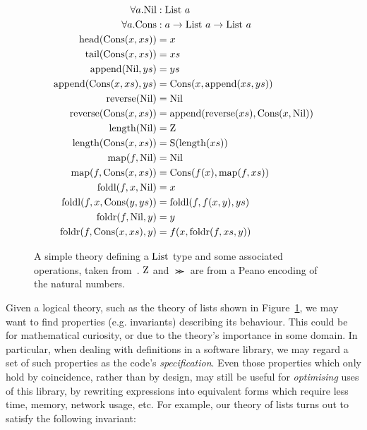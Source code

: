 \begin{figure}
  \begin{equation*}
    \begin{split}
      \forall a. \text{Nil}            &: \text{List} \ a                                  \\
      \forall a. \text{Cons}           &: a \rightarrow \text{List} \ a \rightarrow \text{List} \ a \\
      \text{head}(\text{Cons}(x, xs))        &= x                                       \\
      \text{tail}(\text{Cons}(x, xs))        &= xs                                      \\
      \text{append}(\text{Nil},         ys)  &= ys                                      \\
      \text{append}(\text{Cons}(x, xs), ys)  &= \text{Cons}(x, \text{append}(xs, ys))               \\
      \text{reverse}(\text{Nil})             &= \text{Nil}                                    \\
      \text{reverse}(\text{Cons}(x, xs))     &= \text{append}(\text{reverse}(xs), \text{Cons}(x, \text{Nil}))   \\
      \text{length}(\text{Nil})              &= \text{Z}                                   \\
      \text{length}(\text{Cons}(x, xs))      &= \text{S} (\text{length}(xs))                     \\
      \text{map}(f, \text{Nil})              &= \text{Nil}                                    \\
      \text{map}(f, \text{Cons}(x, xs))      &= \text{Cons}(f(x), \text{map}(f, xs))                \\
      \text{foldl}(f, x, \text{Nil})         &= x                                       \\
      \text{foldl}(f, x, \text{Cons}(y, ys)) &= \text{foldl}(f, f(x, y), ys)                  \\
      \text{foldr}(f, \text{Nil},         y) &= y                                       \\
      \text{foldr}(f, \text{Cons}(x, xs), y) &= f(x, \text{foldr}(f, xs, y))
    \end{split}
  \end{equation*}
  \caption{A simple theory defining a $\text{List}$ type and some associated
    operations, taken from~\cite{Johansson.Dixon.Bundy:conjecture-generation}.
    $\text{Z}$ and $\Succ$ are from a Peano encoding of the natural numbers.}
  \label{figure:list_theory}
\end{figure}

Given a logical theory, such as the theory of lists shown in
Figure~\ref{figure:list_theory}, we may want to find properties (e.g.
invariants) describing its behaviour. This could be for mathematical curiosity,
or due to the theory's importance in some domain. In particular, when dealing
with definitions in a software library, we may regard a set of such properties
as the code's \emph{specification}. Even those properties which only hold by
coincidence, rather than by design, may still be useful for \emph{optimising}
uses of this library, by rewriting expressions into equivalent forms which
require less time, memory, network usage, etc. For example, our theory of lists
turns out to satisfy the following invariant:

